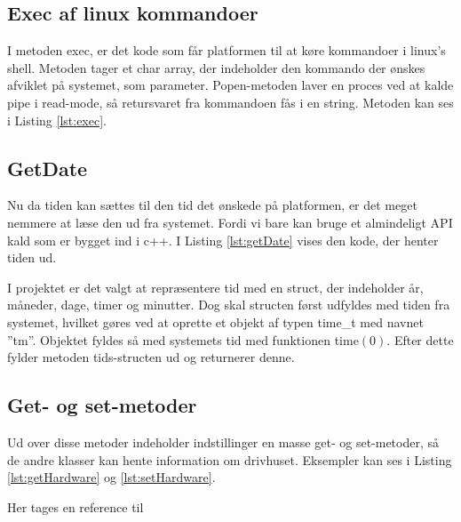 \subsection{Exec af linux kommandoer}

I metoden exec, er det kode som får platformen til at køre kommandoer i linux’s shell. Metoden tager et char array, der indeholder den kommando der ønskes afviklet på systemet, som parameter. Popen-metoden laver en proces ved at kalde pipe i read-mode, så retursvaret fra kommandoen fås i en string. Metoden kan ses i Listing \ref{lst:exec}.



\subsection{GetDate}
Nu da tiden kan sættes til den tid det ønskede på platformen, er det meget nemmere at læse den ud fra systemet. Fordi vi bare kan bruge et almindeligt API kald som er bygget ind i c++. I Listing \ref{lst:getDate} vises den kode, der henter tiden ud.



I projektet er det valgt at repræsentere tid med en struct, der indeholder år, måneder, dage, timer og minutter. Dog skal structen først udfyldes med tiden fra systemet, hvilket gøres ved at oprette et objekt af typen time\_t med navnet ”tm”. Objektet fyldes så med systemets tid med funktionen time$(0)$. Efter dette fylder metoden tids-structen ud og returnerer denne.

\subsection{Get- og set-metoder}

Ud over disse metoder indeholder indstillinger en masse get- og set-metoder, så de andre klasser kan hente information om drivhuset. Eksempler kan ses i Listing \ref{lst:getHardware} og \ref{lst:setHardware}.

Her tages en reference til 


